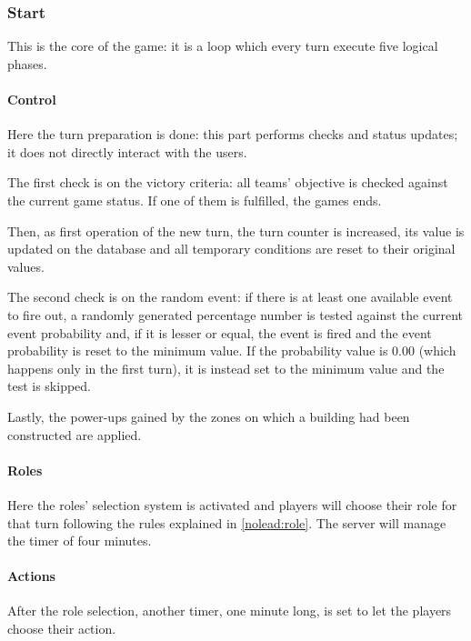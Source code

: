		\subsubsection{Start}
		\label{workflow:start}
			
			This is the core of the game: it is a loop which every turn execute five logical phases.
				
			\paragraph{Control}
			
				Here the turn preparation is done: this part performs checks and status updates; it does not directly interact with the users.
			
				The first check is on the victory criteria: all teams' objective is checked against the current game status. If one of them is fulfilled, the games ends.
				
				Then, as first operation of the new turn, the turn counter is increased, its value is updated on the database and all temporary conditions are reset to their original values.
				
				The second check is on the random event: if there is at least one available event to fire out, a randomly generated percentage number is tested against the current event probability and, if it is lesser or equal, the event is fired and the event probability is reset to the minimum value.
				If the probability value is 0.00 (which happens only in the first turn), it is instead set to the minimum value and the test is skipped.
				
				Lastly, the power-ups gained by the zones on which a building had been constructed are applied.
				
			\paragraph{Roles}
			
				Here the roles' selection system is activated and players will choose their role for that turn following the rules explained in \autoref{nolead:role}.
				The server will manage the timer of four minutes.
				
			\paragraph{Actions}
				
				After the role selection, another timer, one minute long, is set to let the players choose their action.
				
